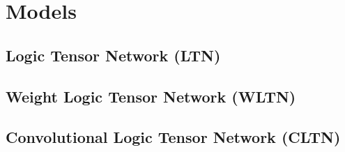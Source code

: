 
\section{Models}

\subsection{Logic Tensor Network (LTN)}

\subsection{Weight Logic Tensor Network (WLTN)}

\subsection{Convolutional Logic Tensor Network (CLTN)}
